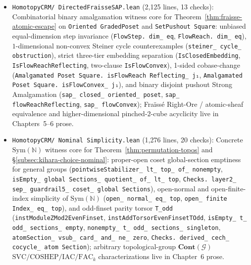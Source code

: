 \begin{itemize}
  \item \texttt{HomotopyCRM/ DirectedFraisseSAP.lean} (2,125 lines, 13 checks): Combinatorial binary amalgamation witness core for Theorem~\ref{thm:fraisse-atomic-escape} on \texttt{Oriented GradedPoset} and \texttt{SetPushout Square}: unbiased equal-dimension step invariance (\texttt{FlowStep. dim\_ eq}, \texttt{FlowReach. dim\_ eq}), $1$-dimensional non-convex Steiner cycle counterexamples (\texttt{steiner\_ cycle\_ obstruction}), strict three-tier embedding separation (\texttt{IsClosedEmbedding}, \texttt{IsFlowReachReflecting}, two-clause \texttt{IsFlowConvex}), 1-sided cobase-change (\texttt{Amalgamated Poset Square. isFlowReach Reflecting\_ j₁}, \texttt{Amalgamated Poset Square. isFlowConvex\_ j₁}), and binary disjoint pushout Strong Amalgamation (\texttt{sap\_ closed\_ oriented\_ poset}, \texttt{sap\_ flowReachReflecting}, \texttt{sap\_ flowConvex}); Fra\"iss\'e Right-Ore / atomic-sheaf equivalence and higher-dimensional pinched-$2$-cube acyclicity live in Chapters~5--6 prose.
  \item \texttt{HomotopyCRM/ Nominal Simplicity.lean} (1,276 lines, 20 checks): Concrete $\mathrm{Sym}(\mathbb{N})$ witness core for Theorem~\ref{thm:permutation-topos} and \S\ref{subsec:kihara-choice-nominal}: proper-open coset global-section emptiness for general groups (\texttt{pointwiseStabilizer\_ lt\_ top\_ of\_ nonempty}, \texttt{isEmpty\_ global Sections\_ quotient\_ of\_ lt\_ top}, \texttt{Checks. layer2\_ sep\_ guardrail5\_ coset\_ global Sections}), open-normal and open-finite-index simplicity of $\mathrm{Sym}(\mathbb{N})$ (\texttt{open\_ normal\_ eq\_ top}, \texttt{open\_ finite Index\_ eq\_ top}), and odd-finset parity torsor \texttt{T\_odd} (\texttt{instModuleZMod2EvenFinset}, \texttt{instAddTorsorEvenFinsetTOdd}, \texttt{isEmpty\_ t\_ odd\_ sections\_ empty}, \texttt{nonempty\_ t\_ odd\_ sections\_ singleton}, \texttt{atomSection\_ vsub\_ card\_ and\_ ne\_ zero}, \texttt{Checks. derived\_ cech\_ cocycle\_ atom Section}); arbitrary topological-group $\mathbf{Cont}(\mathcal{G})$ $\mathrm{SVC}/\mathrm{COSHEP}/\mathrm{IAC}/\mathrm{FAC}_k$ characterizations live in Chapter~6 prose.

\end{itemize}
